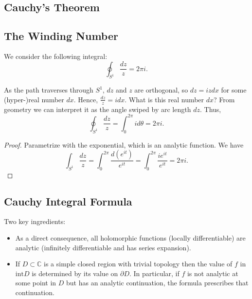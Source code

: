 
\subsection{Cauchy's Theorem}

\subsection{The Winding Number}

We consider the following integral:
\[
	\oint_{S^1} \frac{dz }{z} = 2 \pi i
.\] 

\begin{intuition}
	As the path traverses through $S^1$, $dz $ and $z$ are orthogonal, so $dz = i z dx$ for some (hyper-)real number $dx$. Hence, $\frac{dz}{z} = i dx$. What is this real number $dx$? From geometry we can interpret it as the angle swiped by arc length $dz$. Thus,
	\[
		\oint_{S^1} \frac{dz }{z} = \int _{0}^{2 \pi} i d \theta = 2 \pi i
	.\] 
\end{intuition}
\begin{proof}
	Parametrize with the exponential, which is an analytic function. We have
	\[
		\int _{S^1} \frac{dz }{z}
		= \int _0^{2 \pi} \frac{d(e^{i t})}{e^{i t}}
		= \int _0^{2 \pi} \frac{i e^{i t}}{e^{i t}} = 2 \pi i
	.\] 
\end{proof}

\subsection{Cauchy Integral Formula}

Two key ingredients:
\begin{itemize}
	\item As a direct consequence, all holomorphic functions (locally differentiable) are analytic (infinitely differentiable and has series expansion).
	\item If $D \subset \mathbb{C}$ is a simple closed region with trivial topology then the value of $f$ in $\text{int} D$ is determined by its value on $\partial D$. In particular, if $f$ is not analytic at some point in $D$ but has an analytic continuation, the formula prescribes that continuation.
\end{itemize}






